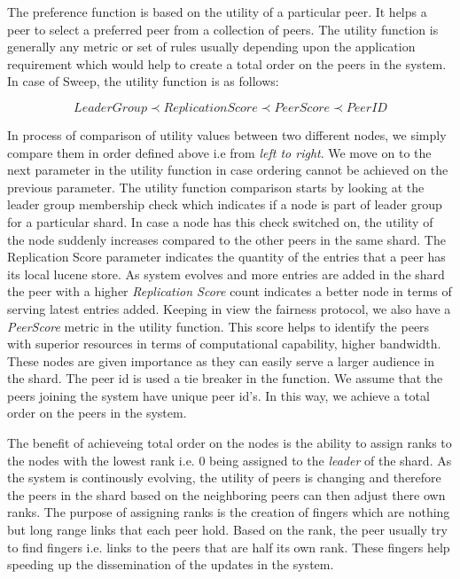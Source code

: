 \documentclass[12pt,a4paper,twoside,openright]{book}
\begin{document}
\par The preference function is based on the utility of a particular peer. It helps a peer to select a preferred peer from a collection of peers. The utility function is generally any metric or set of rules usually depending upon the application requirement which would help to create a total order on the peers in the system. In case of Sweep, the utility function is as follows:

\small 
\begin{equation*}
    LeaderGroup \prec ReplicationScore \prec PeerScore \prec PeerID
\end{equation*}
\normalsize

In process of comparison of utility values between two different nodes, we simply compare them in order defined above i.e from \textit {left to right}. We move on to the next parameter in the utility function in case ordering cannot be achieved on the previous parameter. The utility function comparison starts by looking at the leader group membership check which indicates if a node is part of leader group for a particular shard. In case a node has this check switched on, the utility of the node suddenly increases compared to the other peers in the same shard. The Replication Score parameter indicates the quantity of the entries that a peer has its local lucene store. As system evolves and more entries are added in the shard the peer with a higher \textit{Replication Score} count indicates a better node in terms of serving latest entries added. Keeping in view the fairness protocol, we also have a \textit{PeerScore} metric in the utility function. This score helps to identify the peers with superior resources in terms of computational capability, higher bandwidth. These nodes are given importance as they can easily serve a larger audience in the shard. The peer id is used a tie breaker in the function. We assume that the peers joining the system have unique peer id's.  In this way, we achieve a total order on the peers in the system.

\par The benefit of achieveing total order on the nodes is the ability to assign ranks to the nodes with the lowest rank i.e. 0 being assigned to the \textit{leader} of the shard. As the system is continously evolving, the utility of peers is changing and therefore the peers in the shard based on the neighboring peers can then adjust there own ranks. The purpose of assigning ranks is the creation of fingers which are nothing but long range links that each peer hold. Based on the rank, the peer usually try to find fingers i.e. links to the peers that are half its own rank. These fingers help speeding up the dissemination of the updates in the system.
\end{document}
